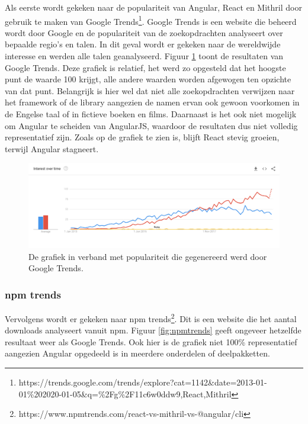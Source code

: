 Als eerste wordt gekeken naar de populariteit van Angular, React en Mithril door gebruik te maken van Google Trends\footnote{https://trends.google.com/trends/explore?cat=1142\&date=2013-01-01\%202020-01-05\&q=\%2Fg\%2F11c6w0ddw9,React,Mithril}. Google Trends is een website die beheerd wordt door Google en de populariteit van de zoekopdrachten analyseert over bepaalde regio's en talen. In dit geval wordt er gekeken naar de wereldwijde interesse en werden alle talen geanalyseerd. Figuur \ref{fig:googletrends} toont de resultaten van Google Trends. Deze grafiek is relatief, het werd zo opgesteld dat het hoogste punt de waarde 100 krijgt, alle andere waarden worden afgewogen ten opzichte van dat punt. Belangrijk is hier wel dat niet alle zoekopdrachten verwijzen naar het framework of de library aangezien de namen ervan ook gewoon voorkomen in de Engelse taal of in fictieve boeken en films. Daarnaast is het ook niet mogelijk om Angular te scheiden van AngularJS, waardoor de resultaten dus niet volledig representatief zijn. Zoals op de grafiek te zien is, blijft React stevig groeien, terwijl Angular stagneert. 

\begin{figure}
    \includegraphics[width=\textwidth]{./img/googletrends.png}
    \caption{De grafiek in verband met populariteit die gegenereerd werd door Google Trends.}
    \label{fig:googletrends}
\end{figure}

\subsubsection{npm trends}

Vervolgens wordt er gekeken naar npm trends\footnote{https://www.npmtrends.com/react-vs-mithril-vs-@angular/cli}. Dit is een website die het aantal downloads analyseert vanuit npm. Figuur \ref{fig:npmtrends} geeft ongeveer hetzelfde resultaat weer als Google Trends. Ook hier is de grafiek niet 100\% representatief aangezien Angular opgedeeld is in meerdere onderdelen of deelpakketten.

